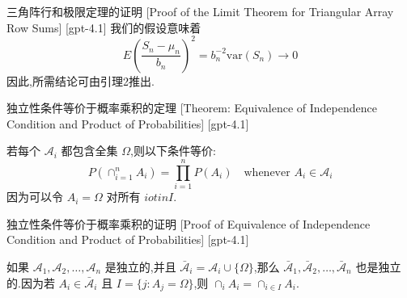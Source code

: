\documentclass[UTF8]{ctexart}
\begin{document}
    
    
    \begin{prf}
        {三角阵行和极限定理的证明}
        [Proof of the Limit Theorem for Triangular Array Row Sums]
        [gpt-4.1]
        我们的假设意味着
\[
E \left( \frac{S_n - \mu_n}{b_n} \right)^2 = b_n^{-2} \mathrm{var}(S_n) \to 0
\]
因此,所需结论可由引理2推出.
    \end{prf}
    
    
    
    \begin{thm}
        {独立性条件等价于概率乘积的定理}
        [Theorem: Equivalence of Independence Condition and Product of Probabilities]
        [gpt-4.1]
        
若每个 $\mathcal{A}_i$ 都包含全集 $\Omega$,则以下条件等价:
\[
P\left( \cap_{i=1}^n A_i \right) = \prod_{i=1}^n P(A_i) \quad \text{whenever } A_i \in \mathcal{A}_i
\]
因为可以令 $A_i = \Omega$ 对所有 $i 
otin I$.

    \end{thm}
    
    
    
    \begin{prf}
        {独立性条件等价于概率乘积的证明}
        [Proof of Equivalence of Independence Condition and Product of Probabilities]
        [gpt-4.1]
        
如果 $\mathcal{A}_1, \mathcal{A}_2, \ldots, \mathcal{A}_n$ 是独立的,并且 $\bar{\mathcal{A}}_i = \mathcal{A}_i \cup \{\Omega\}$,那么 $\bar{\mathcal{A}}_1, \bar{\mathcal{A}}_2, \ldots, \bar{\mathcal{A}}_n$ 也是独立的.因为若 $A_i \in \bar{\mathcal{A}}_i$ 且 $I = \{ j : A_j = \Omega \}$,则 $\cap_i A_i = \cap_{i \in I} A_i$.

    \end{prf}
    
    
    
\end{document}
